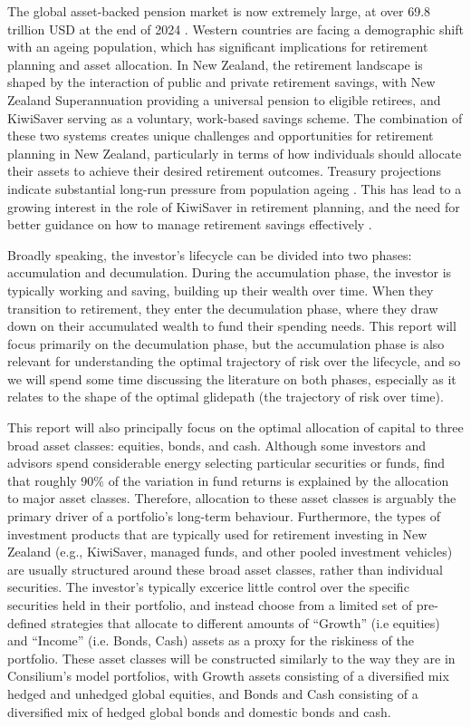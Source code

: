 \documentclass[11pt]{article}
\begin{document}
The global asset-backed pension market is now extremely large, at over 69.8 trillion USD at the end of 2024 \parencite{oecd2025pension}. Western countries are facing a demographic shift with an ageing population, which has significant implications for retirement planning and asset allocation. In New Zealand, the retirement landscape is shaped by the interaction of public and private retirement savings, with New Zealand Superannuation providing a universal pension to eligible retirees, and KiwiSaver serving as a voluntary, work-based savings scheme. The combination of these two systems creates unique challenges and opportunities for retirement planning in New Zealand, particularly in terms of how individuals should allocate their assets to achieve their desired retirement outcomes. Treasury projections indicate substantial long-run pressure from population ageing \parencite{nztreasury2025tirohanga}. This has lead to a growing interest in the role of KiwiSaver in retirement planning, and the need for better guidance on how to manage retirement savings effectively \parencite{national2025kiwisaver, gilbert2025lifting, palmer2025watch, dexter2025kiwisaver}.

Broadly speaking, the investor's lifecycle can be divided into two phases: accumulation and decumulation. During the accumulation phase, the investor is typically working and saving, building up their wealth over time. When they transition to retirement, they enter the decumulation phase, where they draw down on their accumulated wealth to fund their spending needs. This report will focus primarily on the decumulation phase, but the accumulation phase is also relevant for understanding the optimal trajectory of risk over the lifecycle, and so we will spend some time discussing the literature on both phases, especially as it relates to the shape of the optimal glidepath (the trajectory of risk over time). 

This report will also principally focus on the optimal allocation of capital to three broad asset classes: equities, bonds, and cash. Although some investors and advisors spend considerable energy selecting particular securities or funds, \textcite{ibbotsonAssetAllocation} find that roughly 90\% of the variation in fund returns is explained by the allocation to major asset classes. Therefore, allocation to these asset classes is arguably the primary driver of a portfolio's long-term behaviour. Furthermore, the types of investment products that are typically used for retirement investing in New Zealand (e.g., KiwiSaver, managed funds, and other pooled investment vehicles) are usually structured around these broad asset classes, rather than individual securities. The investor's typically excerice little control over the specific securities held in their portfolio, and instead choose from a limited set of pre-defined strategies that allocate to different amounts of ``Growth'' (i.e equities) and ``Income'' (i.e. Bonds, Cash) assets as a proxy for the riskiness of the portfolio. These asset classes will be constructed similarly to the way they are in Consilium's model portfolios, with Growth assets consisting of a diversified mix hedged and unhedged global equities, and Bonds and Cash consisting of a diversified mix of hedged global bonds and domestic bonds and cash. 
\end{document}
